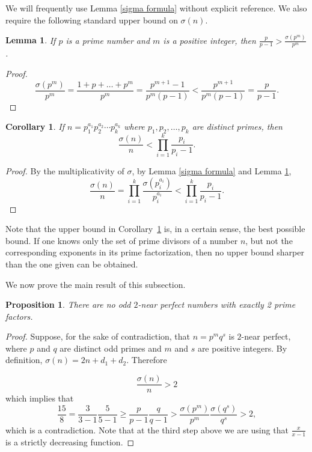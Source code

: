 \documentclass[10pt]{article}
\newtheorem{lemma}{Lemma}
\newtheorem{proposition}{Proposition}
\newtheorem{corollary}{Corollary}
\theoremstyle{definition}
\begin{document}
We will frequently use Lemma \ref{sigma formula} without explicit reference. We also require the following standard upper bound on $\sigma(n)$.

\begin{lemma}
\label{sigma upper bound}
    If $p$ is a prime number and $m$ is a positive integer, then $\frac{p}{p-1}>\frac{\sigma(p^m)}{p^m}$.
\end{lemma}
\begin{proof}
$$\frac{\sigma(p^m)}{p^m}=\frac{1+p+\ldots+p^m}{p^m}=\frac{p^{m+1}-1}{p^m(p-1)}<\frac{p^{m+1}}{p^m(p-1)}=\frac{p}{p-1}.$$

\end{proof}

\begin{corollary}
\label{cor:sigma_multiplicative_bound}
    If $n = p_1^{a_1} p_2^{a_2} \cdots p_k^{a_k}$ where $p_1, p_2, \ldots, p_k$ are distinct primes, then
    $$\frac{\sigma(n)}{n} < \prod_{i=1}^k \frac{p_i}{p_i-1}.$$
\end{corollary}
\begin{proof}
    By the multiplicativity of $\sigma$, by Lemma \ref{sigma formula} and Lemma \ref{sigma upper bound},
    $$\frac{\sigma(n)}{n} = \prod_{i=1}^k \frac{\sigma(p_i^{a_i})}{p_i^{a_i}} < \prod_{i=1}^k \frac{p_i}{p_i-1}.$$
\end{proof}

Note that the upper bound in Corollary~\ref{cor:sigma_multiplicative_bound} is, in a certain sense, the best possible bound. If one knows only the set of prime divisors of a number $n$, but not the corresponding exponents in its prime factorization, then no upper bound sharper than the one given can be obtained.

We now prove the main result of this subsection.

\begin{proposition}\label{prop:no_odd_2near}
    There are no odd $2$-near perfect numbers with exactly 2 prime factors.
\end{proposition}
\begin{proof}
    Suppose, for the sake of contradiction, that $n=p^mq^s$ is $2$-near perfect, where $p$ and $q$ are distinct odd primes and $m$ and $s$ are positive integers. By definition, $\sigma(n)=2n+d_1+d_2$. Therefore

    $$\frac{\sigma(n)}{n}>2$$ which implies that 
    \begin{equation*}
     \frac{15}{8} =  \frac{3}{3-1}\frac{5}{5-1} \geq   \frac{p}{p-1}\frac{q}{q-1}> \frac{\sigma(p^m)}{p^m}\frac{\sigma(q^s)}{q^s}> 2,
    \end{equation*}
    which is a contradiction. Note that at the third step above we are using that $\frac{x}{x-1}$ is a strictly decreasing function.
\end{proof}
\end{document}
